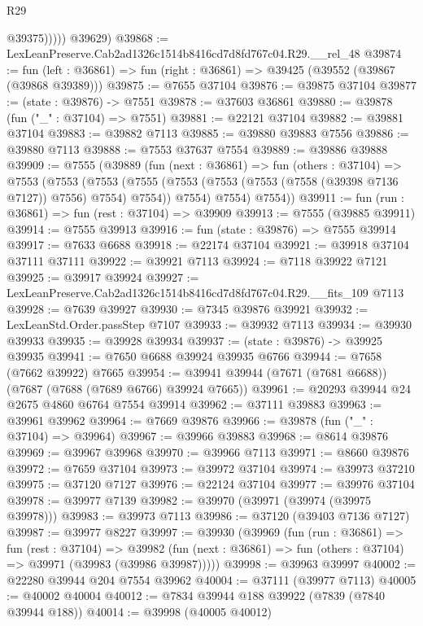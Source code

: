 \begin{lexlean}{R29}
\begin{coremodule}
                @39375)))))
      @39629)
@39868 := LexLeanPreserve.Cab2ad1326c1514b8416cd7d8fd767c04.R29.__rel_48
@39874 := fun (left : @36861) => fun (right : @36861) => @39425 (@39552 (@39867 (@39868 @39389)))
@39875 := @7655 @37104
@39876 := @39875 @37104
@39877 := (state : @39876) -> @7551
@39878 := @37603 @36861
@39880 := @39878 (fun ("_" : @37104) => @7551)
@39881 := @22121 @37104
@39882 := @39881 @37104
@39883 := @39882 @7113
@39885 := @39880 @39883 @7556
@39886 := @39880 @7113
@39888 := @7553 @37637 @7554
@39889 := @39886 @39888
@39909 := @7555
    (@39889
      (fun (next : @36861) =>
      fun (others : @37104) =>
      @7553
        (@7553
          (@7553
            (@7555 (@7553 (@7553 (@7553 (@7558 (@39398 @7136 @7127)) @7556) @7554) @7554))
            @7554)
          @7554)
        @7554))
@39911 := fun (run : @36861) => fun (rest : @37104) => @39909
@39913 := @7555 (@39885 @39911)
@39914 := @7555 @39913
@39916 := fun (state : @39876) => @7555 @39914
@39917 := @7633 @6688
@39918 := @22174 @37104
@39921 := @39918 @37104 @37111 @37111
@39922 := @39921 @7113
@39924 := @7118 @39922 @7121
@39925 := @39917 @39924
@39927 := LexLeanPreserve.Cab2ad1326c1514b8416cd7d8fd767c04.R29.__fits_109 @7113
@39928 := @7639 @39927
@39930 := @7345 @39876 @39921
@39932 := LexLeanStd.Order.passStep @7107
@39933 := @39932 @7113
@39934 := @39930 @39933
@39935 := @39928 @39934
@39937 := (state : @39876) -> @39925 @39935
@39941 := @7650 @6688 @39924 @39935 @6766
@39944 := @7658 (@7662 @39922) @7665
@39954 := @39941 @39944 (@7671 (@7681 @6688)) (@7687 (@7688 (@7689 @6766) @39924 @7665))
@39961 := @20293 @39944 @24 @2675 @4860 @6764 @7554 @39914
@39962 := @37111 @39883
@39963 := @39961 @39962
@39964 := @7669 @39876
@39966 := @39878 (fun ("_" : @37104) => @39964)
@39967 := @39966 @39883
@39968 := @8614 @39876
@39969 := @39967 @39968
@39970 := @39966 @7113
@39971 := @8660 @39876
@39972 := @7659 @37104
@39973 := @39972 @37104
@39974 := @39973 @37210
@39975 := @37120 @7127
@39976 := @22124 @37104
@39977 := @39976 @37104
@39978 := @39977 @7139
@39982 := @39970 (@39971 (@39974 (@39975 @39978)))
@39983 := @39973 @7113
@39986 := @37120 (@39403 @7136 @7127)
@39987 := @39977 @8227
@39997 := @39930
    (@39969
      (fun (run : @36861) =>
      fun (rest : @37104) =>
      @39982 (fun (next : @36861) => fun (others : @37104) => @39971 (@39983 (@39986 @39987)))))
@39998 := @39963 @39997
@40002 := @22280 @39944 @204 @7554 @39962
@40004 := @37111 (@39977 @7113)
@40005 := @40002 @40004
@40012 := @7834 @39944 @188 @39922 (@7839 (@7840 @39944 @188))
@40014 := @39998 (@40005 @40012)

\end{coremodule}
\end{lexlean}
